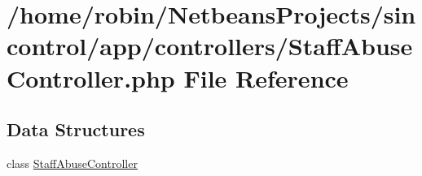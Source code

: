 \hypertarget{_staff_abuse_controller_8php}{}\section{/home/robin/\+Netbeans\+Projects/sincontrol/app/controllers/\+Staff\+Abuse\+Controller.php File Reference}
\label{_staff_abuse_controller_8php}
\subsection*{Data Structures}
\begin{DoxyCompactItemize}
\item 
class \hyperlink{class_staff_abuse_controller}{Staff\+Abuse\+Controller}
\end{DoxyCompactItemize}
